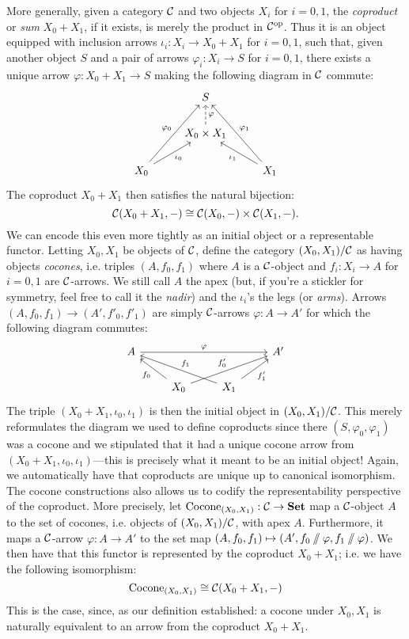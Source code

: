 More generally, given a category $\mathcal{C}$ and two objects $X_i$ for $i=0,1$, the \emph{coproduct} or \emph{sum} $X_0+X_1$, if it exists, is merely the product in $\mathcal{C}^{\text{op}}$. Thus it is an object equipped with inclusion arrows $\iota_i:X_i\to X_0+ X_1$ for $i=0,1$, such that, given another object $S$ and a pair of arrows $\varphi_i:X_i\to S$ for $i=0,1$, there exists a unique arrow $\varphi: X_0+X_1\to S$ making the following diagram in $\mathcal{C}$ commute:
\[
\begin{tikzcd}
& S & \\
& X_0\times X_1 \arrow[u,"\varphi"', dashed]  &\\
X_0 \arrow[ur,"\iota_{0}"']  \arrow[uur,"\varphi_{0}"] & & X_1  \arrow[ul,"\iota_{1}"] \arrow[uul,"\varphi_{1}"']
\end{tikzcd}
\]
The coproduct $X_0+ X_1$ then satisfies the natural bijection:
\[\mathcal{C}(X_0+ X_1,-)\cong\mathcal{C}(X_0,-)\times\mathcal{C}(X_1,-).\]
We can encode this even more tightly as an initial object or a representable functor. Letting $X_0,X_1$ be objects of $\mathcal{C}$, define the category $(X_0,X_1)/\mathcal{C}$ as having objects \emph{cocones}, i.e. triples $(A,f_0,f_1)$ where $A$ is a $\mathcal{C}$-object and $f_i:X_i\to A$ for $i=0,1$ are $\mathcal{C}$-arrows. We still call $A$ the apex (but, if you're a stickler for symmetry, feel free to call it the \emph{nadir}) and the  $\iota_i$'s the legs (or \emph{arms}). Arrows $(A,f_0,f_1)\to (A',f'_0,f'_1)$ are simply $\mathcal{C}$-arrows $\varphi:A\to A'$ for which the following diagram commutes:
\[
\begin{tikzcd}
A \arrow[rrr,"\varphi"]   &&& A'   \\
& X_0 \arrow[ul,"f_0"] \arrow[urr,"f'_0"] & X_1 \arrow[ur,"f'_1"'] \arrow[ull,"f_1"'] &
\end{tikzcd}
\]
The triple $(X_0+ X_1,\iota_0,\iota_1)$ is then the initial object in $(X_0,X_1)/\mathcal{C}$. This merely reformulates the diagram we used to define coproducts since there $(S,\varphi_0,\varphi_1)$ was a cocone and we stipulated that it had a unique cocone arrow from $(X_0+ X_1,\iota_0,\iota_1)$---this is precisely what it meant to be an initial object! Again, we automatically have that coproducts are unique up to canonical isomorphism. The cocone constructions also allows us to codify the representability perspective of the coproduct. More precisely, let $\operatorname{Cocone}_{(X_0,X_1)}:\mathcal{C}\to\mathbf{Set}$ map a $\mathcal{C}$-object $A$ to the set of cocones, i.e. objects of $(X_0,X_1)/\mathcal{C}$, with apex $A$. Furthermore, it maps a $\mathcal{C}$-arrow $\varphi:A\to A'$ to the set map $(A,f_0,f_1)\mapsto (A', f_0\sslash\varphi, f_1 \sslash\varphi)$. We then have that this functor is represented by the coproduct $X_0+ X_1$; i.e. we have the following isomorphism:
\[\operatorname{Cocone}_{(X_0,X_1)}\cong \mathcal{C}(X_0+X_1,-)\]
This is the case, since, as our definition established: a cocone under $X_0,X_1$ is naturally equivalent to an arrow from the coproduct $X_0+X_1$.

